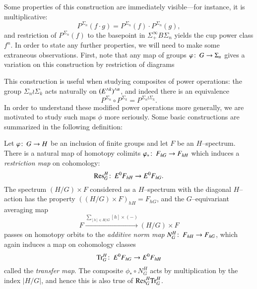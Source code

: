 Some properties of this construction are immediately visible---for instance, it is multiplicative: \[P^{\Sigma_n}(f \cdot g) = P^{\Sigma_n}(f) \cdot P^{\Sigma_n}(g),\] and restriction of $P^{\Sigma_n}(f)$ to the basepoint in $\Sigma^\infty_+ B\Sigma_n$ yields the cup power class $f^n$.  In order to state any further properties, we will need to make some extraneous observations.  First, note that any map of groups $\varphi\colon\thinspace G \to \Sigma_n$ gives a variation on this construction by restriction of diagrams
\begin{center}
\end{center}
This construction is useful when studying composites of power operations: the group $\Sigma_n \wr \Sigma_k$ acts naturally on $(E^{\wedge k})^{\wedge n}$, and indeed there is an equivalence \[P^{\Sigma_n} \circ P^{\Sigma_k} = P^{\Sigma_n \wr \Sigma_k}.\]  In order to understand these modified power operations more generally, we are motivated to study such maps $\phi$ more seriously.  Some basic constructions are summarized in the following definition:
\begin{definition}
Let $\varphi\colon\thinspace G \to H$ be an inclusion of finite groups and let $F$ be an $H$--spectrum.  There is a natural map of homotopy colimits $\varphi_*\colon\thinspace F_{hG} \to F_{hH}$ which induces a \textit{restriction map} on cohomology: \[\mathrm{Res}_G^H\colon\thinspace E^0 F_{hH} \to E^0 F_{hG}.\]  The spectrum $(H/G) \times F$ considered as a $H$--spectrum with the diagonal $H$--action has the property $((H/G) \times F)_{hH} = F_{hG}$, and the $G$--equivariant averaging map \[F \xrightarrow{\displaystyle \sum_{[h] \in H/G} [h] \times (-)} (H/G) \times F\] passes on homotopy orbits to the \textit{additive norm map} $N_G^H\colon\thinspace F_{hH} \to F_{hG}$, which again induces a map on cohomology classes \[\mathrm{Tr}_G^H\colon\thinspace E^0 F_{hG} \to E^0 F_{hH}\] called the \textit{transfer map}.  The composite $\phi_* \circ N_G^H$ acts by multiplication by the index $|H/G|$, and hence this is also true of $\mathrm{Res}^H_G \mathrm{Tr}^H_G$.
\end{definition}

